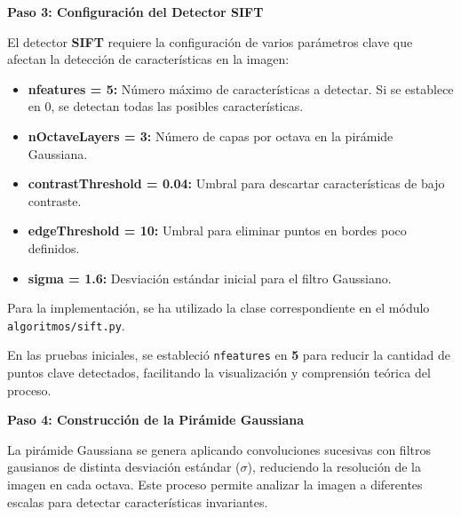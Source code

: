 \documentclass[a4paper]{article}
\begin{document}
\textbf{Paso 3: Configuración del Detector SIFT}
\par\vspace{0.5cm}

El detector \textbf{SIFT} requiere la configuración de varios parámetros clave que afectan la detección de características en la imagen:

\begin{itemize}
    \item \textbf{nfeatures = 5:} Número máximo de características a detectar. Si se establece en 0, se detectan todas las posibles características.
    \item \textbf{nOctaveLayers = 3:} Número de capas por octava en la pirámide Gaussiana.
    \item \textbf{contrastThreshold = 0.04:} Umbral para descartar características de bajo contraste.
    \item \textbf{edgeThreshold = 10:} Umbral para eliminar puntos en bordes poco definidos.
    \item \textbf{sigma = 1.6:} Desviación estándar inicial para el filtro Gaussiano.
\end{itemize}

Para la implementación, se ha utilizado la clase correspondiente en el módulo \texttt{algoritmos/sift.py}. 
\par\vspace{0.5cm}
En las pruebas iniciales, se estableció \texttt{nfeatures} en \textbf{5} para reducir la cantidad de puntos clave detectados, 
facilitando la visualización y comprensión teórica del proceso.
\par\vspace{0.5cm}

\textbf{Paso 4: Construcción de la Pirámide Gaussiana}
\par\vspace{0.5cm}

La pirámide Gaussiana se genera aplicando convoluciones sucesivas con filtros gausianos de distinta desviación estándar (\(\sigma\)), reduciendo la resolución de la imagen en cada octava. Este proceso permite analizar la imagen a diferentes escalas para detectar características invariantes.
\end{document}
